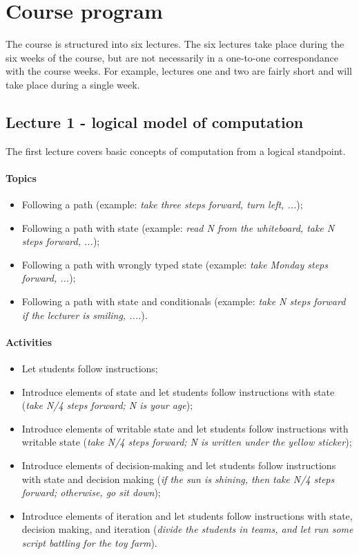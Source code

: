 \section{Course program}
	The course is structured into six lectures. The six lectures take place during the six weeks of the course, but are not necessarily in a one-to-one correspondance with the course weeks. For example, lectures one and two are fairly short and will take place during a single week.

	\subsection{Lecture 1 - logical model of computation}
		The first lecture covers basic concepts of computation from a logical standpoint.

		\paragraph*{Topics}
			\begin{itemize}
				\item Following a path (example: \textit{take three steps forward, turn left, ...});
				\item Following a path with state (example: \textit{read N from the whiteboard, take N steps forward, ...});
				\item Following a path with wrongly typed state (example: \textit{take Monday steps forward, ...});
				\item Following a path with state and conditionals (example: \textit{take N steps forward if the lecturer is smiling, ....}).
			\end{itemize}

		\paragraph*{Activities}
			\begin{itemize}
				\item Let students follow instructions;
				\item Introduce elements of state and let students follow instructions with state (\textit{take N/4 steps forward; N is your age});
				\item Introduce elements of writable state and let students follow instructions with writable state (\textit{take N/4 steps forward; N is written under the yellow sticker});
				\item Introduce elements of decision-making and let students follow instructions with state and decision making (\textit{if the sun is shining, then take N/4 steps forward; otherwise, go sit down});
				\item Introduce elements of iteration and let students follow instructions with state, decision making, and iteration (\textit{divide the students in teams, and let run some script battling for the toy farm}).
			\end{itemize}

